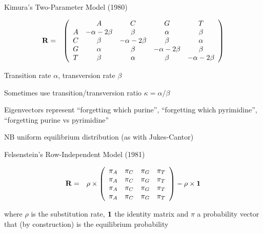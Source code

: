 \documentclass{beamer}
\begin{document}
\begin{frame}{Kimura's Two-Parameter Model (1980)}

\begin{eqnarray*}
{\bf R} & = & \left( \begin{array}{ccccc}
& A & C & G & T \\
A & -\alpha-2\beta & \beta & \alpha & \beta \\
C & \beta & -\alpha-2\beta & \beta & \alpha \\
G & \alpha & \beta & -\alpha-2\beta & \beta \\
T & \beta & \alpha & \beta & -\alpha-2\beta
\end{array} \right)
\end{eqnarray*}

Transition rate $\alpha$, transversion rate $\beta$

Sometimes use \alert{transition/transversion ratio} $\kappa = \alpha / \beta$

Eigenvectors represent ``forgetting which purine'', ``forgetting which pyrimidine'', ``forgetting purine vs pyrimidine''

NB uniform equilibrium distribution (as with Jukes-Cantor)

\end{frame}


\begin{frame}{Felsenstein's Row-Independent Model (1981)}

\begin{eqnarray*}
{\bf R} & = & \rho \times \left( \begin{array}{cccc}
\pi_A & \pi_C & \pi_G & \pi_T \\
\pi_A & \pi_C & \pi_G & \pi_T \\
\pi_A & \pi_C & \pi_G & \pi_T \\
\pi_A & \pi_C & \pi_G & \pi_T
\end{array} \right)
- \rho \times {\bf 1}
\end{eqnarray*}

where $\rho$ is the substitution rate, ${\bf 1}$ the identity matrix and $\pi$ a probability vector that (by construction) is the equilibrium probability

\end{frame}
\end{document}
